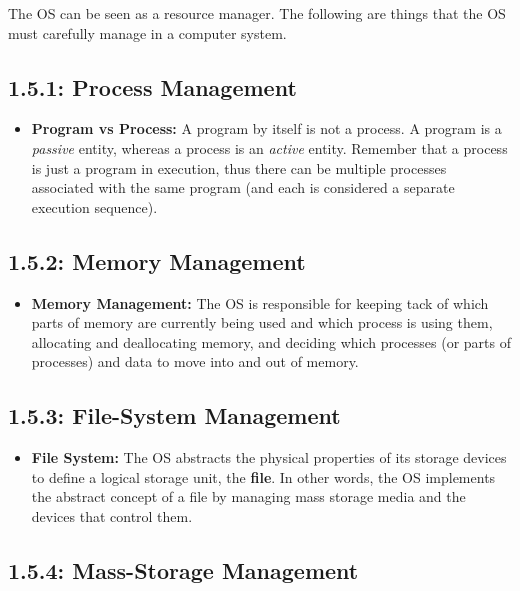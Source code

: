 \documentclass[12pt]{article}
\begin{document}
The OS can be seen as a resource manager. The following are things that the OS must carefully manage in a computer system.

\subsection*{1.5.1: Process Management}

\begin{itemize}
    \item \textbf{Program vs Process:} A program by itself is not a process. A program is a \textit{passive} entity, whereas a process is an \textit{active} entity. Remember that a process is just a program in execution, thus there can be multiple processes associated with the same program (and each is considered a separate execution sequence).
\end{itemize}

\subsection*{1.5.2: Memory Management}

\begin{itemize}
    \item \textbf{Memory Management:} The OS is responsible for keeping tack of which parts of memory are currently being used and which process is using them, allocating and deallocating memory, and deciding which processes (or parts of processes) and data to move into and out of memory.
\end{itemize}

\subsection*{1.5.3: File-System Management}

\begin{itemize}
    \item \textbf{File System:} The OS abstracts the physical properties of its storage devices to define a logical storage unit, the \textbf{file}. In other words, the OS implements the abstract concept of a file by managing mass storage media and the devices that control them.
\end{itemize}

\subsection*{1.5.4: Mass-Storage Management}
\end{document}
